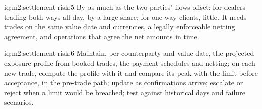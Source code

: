 \begin{solution}{iq:m2:settlement-risk:5}
By as much as the two parties' flows offset: for dealers trading both ways all day,
by a large share; for one-way clients, little. It needs trades on the same value
date and currencies, a legally enforceable netting agreement, and operations that
agree the net amounts in time.
\end{solution}

\begin{solution}{iq:m2:settlement-risk:6}
Maintain, per counterparty and value date, the projected exposure profile from
booked trades, the payment schedules and netting; on each new trade, compute the
profile with it and compare its peak with the limit before acceptance, in the
pre-trade path; update as confirmations arrive; escalate or reject when a limit
would be breached; test against historical days and failure scenarios.
\end{solution}
